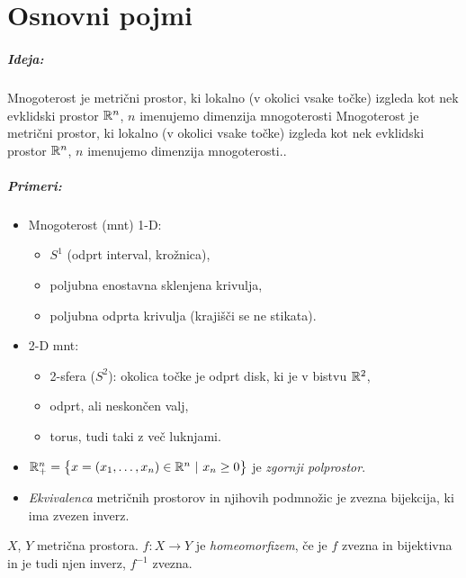 \chapter{Osnovni pojmi}

\paragraph{Ideja:} Mnogoterost je metri\v cni prostor, ki lokalno (v okolici vsake to\v cke) izgleda kot nek evklidski prostor $\mathbb{R}^n$, $n$
imenujemo dimenzija mnogoterosti Mnogoterost je metri\v cni prostor, ki lokalno (v okolici vsake to\v cke) izgleda kot nek evklidski prostor $\mathbb{R}^n$, $n$
imenujemo dimenzija mnogoterosti..

\paragraph{Primeri:}
\begin{itemize}
	\item{Mnogoterost (mnt) 1-D:
		\begin{itemize}
			\item{$S^1$ (odprt interval, kro\v znica),}
			\item{poljubna enostavna sklenjena krivulja,}
			\item{poljubna odprta krivulja (kraji\v s\v ci se ne stikata).}
		\end{itemize}}
	\item{2-D mnt:
		\begin{itemize}
			\item{2-sfera ($S^2$): okolica to\v cke je odprt disk, ki je v bistvu $\mathbb{R}^2$,}
			\item{odprt, ali neskon\v cen valj,}
			\item{torus, tudi taki z ve\v c luknjami.}
		\end{itemize}}
\end{itemize}

\begin{defin}
	\begin{itemize}
		\item{$\mathbb{R}^n_+ = \big\{x = (x_1,\ldots,x_n) \in \mathbb{R}^n\ |\ x_n \geq 0\big\}$ je \emph{zgornji polprostor}.}
		\item{\emph{Ekvivalenca} metri\v cnih prostorov in njihovih podmno\v zic je zvezna bijekcija, ki ima zvezen
			inverz.}
	\end{itemize}
\end{defin}

\begin{defin}
	$X$, $Y$ metri\v cna prostora. $f : X \to Y$ je \emph{homeomorfizem}, \v ce je $f$ zvezna in bijektivna in je tudi njen
	inverz, $f^{-1}$ zvezna.
\end{defin}

